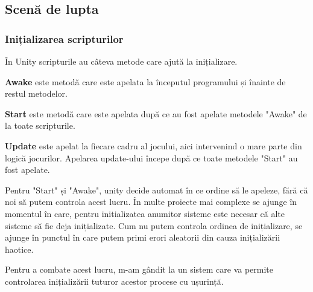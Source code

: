 \documentclass[12pt, a4paper]{article}
\begin{document}
	\subsection{Scenă de lupta}
	
	\subsubsection{Inițializarea scripturilor}
	\label{section: initialization}
	
	În Unity scripturile au câteva metode care ajută la inițializare.
	\newline
	
	\textbf{Awake} este metodă care este apelata la începutul programului și înainte de restul metodelor.
	\newline
	
	\textbf{Start} este metodă care este apelata după ce au fost apelate metodele "Awake" de la toate scripturile.
	\newline
	
	\textbf{Update} este apelat la fiecare cadru al jocului, aici intervenind o mare parte din logică jocurilor. Apelarea update-ului începe după ce toate metodele "Start" au fost apelate.
	\newline
	
	Pentru "Start" și "Awake", unity decide automat în ce ordine să le apeleze, fără că noi să putem controla acest lucru. În multe proiecte mai complexe se ajunge în momentul în care, pentru initializatea anumitor sisteme este necesar că alte sisteme să fie deja inițializate. Cum nu putem controla ordinea de inițializare, se ajunge în punctul în care putem primi erori aleatorii din cauza inițializării haotice.
	\newline
	
	Pentru a combate acest lucru, m-am gândit la un sistem care va permite controlarea inițializării tuturor acestor procese cu ușurință.
	
	
\end{document}
